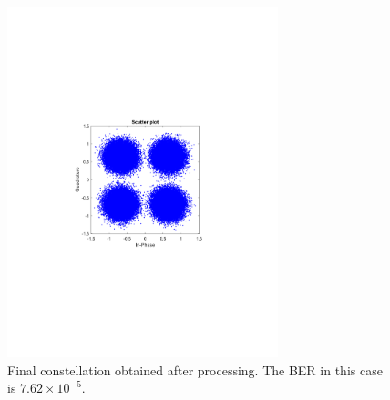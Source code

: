 \begin{refsection}
\begin{figure}[H]
	\centering
	\includegraphics[clip, trim=4cm 8cm 4cm 8cm,
	width=0.7\textwidth]{./sdf/m_qam_system/figures/expResults/intradyne/7_16GBdInSig13dB_const.pdf}
	\caption{Final constellation obtained after processing. The BER in this case is $7.62 \times 10^{-5}$.}
	\label{fig:16GBdFinal}
\end{figure}


\end{refsection}
